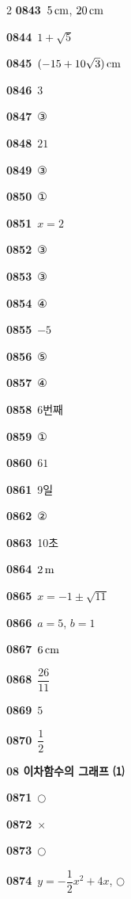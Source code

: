 \documentclass[10pt,a4paper]{article}
\begin{document}
\begin{multicols}{2}
\noindent\textbf{0843}\ $5\mkern3mu \mathrm{cm}$, $20\mkern3mu \mathrm{cm}$\par
\noindent\textbf{0844}\ $1+\sqrt{5}$\par
\noindent\textbf{0845}\ $(-15+10\sqrt{3})\mkern3mu \mathrm{cm}$\par
\noindent\textbf{0846}\ $3$\par
\noindent\textbf{0847}\ ③\par
\noindent\textbf{0848}\ $21$\par
\noindent\textbf{0849}\ ③\par
\noindent\textbf{0850}\ ①\par
\noindent\textbf{0851}\ $x=2$\par
\noindent\textbf{0852}\ ③\par
\noindent\textbf{0853}\ ③\par
\noindent\textbf{0854}\ ④\par
\noindent\textbf{0855}\ $-5$\par
\noindent\textbf{0856}\ ⑤\par
\noindent\textbf{0857}\ ④\par
\noindent\textbf{0858}\ 6번째\par
\noindent\textbf{0859}\ ①\par
\noindent\textbf{0860}\ $61$\par
\noindent\textbf{0861}\ 9일\par
\noindent\textbf{0862}\ ②\par
\noindent\textbf{0863}\ 10초\par
\noindent\textbf{0864}\ $2\mkern3mu \mathrm{m}$\par
\noindent\textbf{0865}\ $x=-1\pm\sqrt{11}$\par
\noindent\textbf{0866}\ $a=5$, $b=1$\par
\noindent\textbf{0867}\ $6\mkern3mu \mathrm{cm}$\par
\noindent\textbf{0868}\ $\dfrac{26}{11}$\par
\noindent\textbf{0869}\ $5$\par
\noindent\textbf{0870}\ $\dfrac{1}{2}$\par
\noindent\textbf{08 이차함수의 그래프 ⑴}\par\smallskip
\noindent\textbf{0871}\ $\bigcirc$\par
\noindent\textbf{0872}\ $\times$\par
\noindent\textbf{0873}\ $\bigcirc$\par
\noindent\textbf{0874}\ $y=-\dfrac{1}{2}x^2+4x$, $\bigcirc$\par

\end{multicols}
\end{document}
